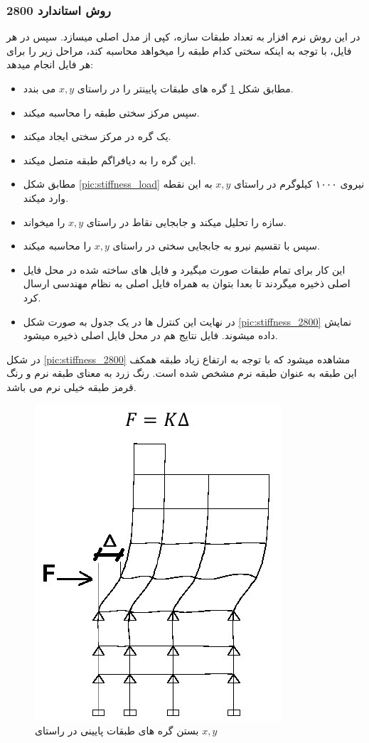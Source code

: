 \subsubsection{روش استاندارد 2800}
در این روش نرم افزار به تعداد طبقات سازه، کپی از مدل اصلی میسازد. سپس در هر فایل،‌ با توجه به اینکه سختی کدام طبقه را میخواهد محاسبه کند، مراحل زیر را  برای هر فایل انجام میدهد:
\begin{itemize}
    \item مطابق شکل \ref{pic:tie_below_story_nodes} گره های طبقات پایینتر را در راستای $ x, y$ می بندد.
    \item سپس مرکز سختی طبقه را محاسبه میکند.
    \item  یک گره در مرکز سختی ایجاد میکند.
    \item این گره را به دیافراگم طبقه متصل میکند.
    \item مطابق شکل \ref{pic:stiffness_load} نیروی ۱۰۰۰ کیلوگرم در راستای $ x, y$ به این نقطه وارد میکند.
    \item سازه را تحلیل میکند و جابجایی نقاط در راستای $ x, y$ را میخواند.
    \item سپس با تقسیم نیرو به جابجایی سختی در راستای $ x, y$ را محاسبه میکند.
    \item این کار برای تمام طبقات صورت میگیرد و فایل های ساخته شده در محل فایل اصلی ذخیره میگردند تا بعدا بتوان به همراه فایل اصلی به نظام مهندسی ارسال کرد.
    \item  در نهایت این کنترل ها در  یک  جدول به صورت شکل \ref{pic:stiffness_2800} نمایش داده میشوند. فایل نتایج هم در محل فایل اصلی ذخیره میشود.
\end{itemize}

در شکل \ref{pic:stiffness_2800} مشاهده میشود که با توجه به ارتفاع زیاد طبقه همکف این طبقه به عنوان طبقه نرم مشخص شده است. رنگ زرد به معنای طبقه نرم و رنگ قرمز طبقه خیلی نرم می باشد.

\begin{figure}[H]
    \centering
    \includegraphics[scale=0.8]{figures/stiffness1}
    \caption{بستن گره های طبقات پایینی در راستای $x, y$ }
    \label{pic:tie_below_story_nodes}
\end{figure}

